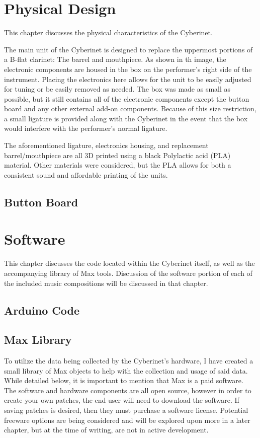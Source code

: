 \chapter{Physical Design}
This chapter discusses the physical characteristics of the Cyberinet.

The main unit of the Cyberinet is designed to replace the uppermost portions of a B-flat clarinet: The barrel and mouthpiece. As shown in th image, the electronic components are housed in the box on the performer's right side of the instrument. Placing the electronics here allows for the unit to be easily adjusted for tuning or be easily removed as needed. The box was made as small as possible, but it still contains all of the electronic components except the button board and any other external add-on components. Because of this size restriction, a small ligature is provided along with the Cyberinet in the event that the box would interfere with the performer's normal ligature.

The aforementioned ligature, electronics housing, and replacement barrel/mouthpiece are all 3D printed using a black Polylactic acid (PLA) material. Other materials were considered, but the PLA allows for both a consistent sound and affordable printing of the units.


\section{Button Board}


\chapter{Software}
This chapter discusses the code located within the Cyberinet itself, as well as the accompanying library of Max tools. Discussion of the software portion of each of the included music compositions will be discussed in that chapter. 

\section{Arduino Code}

\section{Max Library}

To utilize the data being collected by the Cyberinet’s hardware, I have created a small library of Max objects to help with the collection and usage of said data. While detailed below, it is important to mention that Max is a paid software. The software and hardware components are all open source, however in order to create your own patches, the end-user will need to download the software. If saving patches is desired, then they must purchase a software license. Potential freeware options are being considered and will be explored upon more in a later chapter, but at the time of writing, are not in active development.

